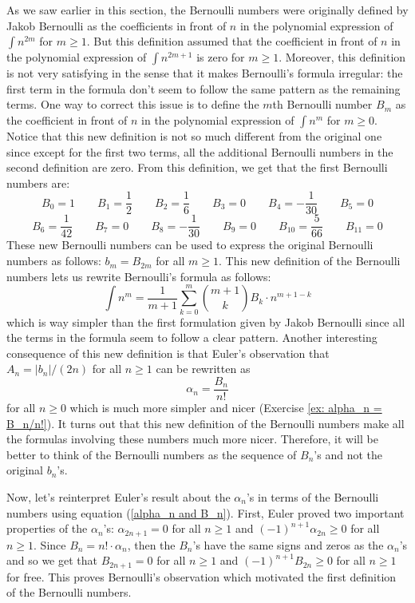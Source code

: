As we saw earlier in this section, the Bernoulli numbers were originally defined by Jakob Bernoulli as the coefficients in front of $n$ in the polynomial expression of $\int n^{2m}$ for $m \geq 1$. But this definition assumed that the coefficient in front of $n$ in the polynomial expression of $\int n^{2m+1}$ is zero for $m \geq 1$. Moreover, this definition is not very satisfying in the sense that it makes Bernoulli's formula irregular: the first term in the formula don't seem to follow the same pattern as the remaining terms. One way to correct this issue is to define the $m$th Bernoulli number $B_m$ as the coefficient in front of $n$ in the polynomial expression of $\int n^m$ for $m \geq 0$. Notice that this new definition is not so much different from the original one since except for the first two terms, all the additional Bernoulli numbers in the second definition are zero. From this definition, we get that the first Bernoulli numbers are:
$$B_0 = 1 \qquad B_1 = \frac{1}{2} \qquad B_2 = \frac{1}{6} \qquad B_3 = 0 \qquad B_4 = - \frac{1}{30} \qquad B_5 = 0 $$
$$B_6 = \frac{1}{42} \qquad B_7 = 0 \qquad B_8 = -\frac{1}{30} \qquad B_9 = 0 \qquad B_{10} = \frac{5}{66} \qquad B_{11} = 0$$
These new Bernoulli numbers can be used to express the original Bernoulli numbers as follows: $b_m = B_{2m}$ for all $m \geq 1$. This new definition of the Bernoulli numbers lets us rewrite Bernoulli's formula as follows:
\begin{equation} \label{Modern Bernoullis Formula}
    \int n^m = \frac{1}{m+1}\sum_{k=0}^{m}\binom{m+1}{k}B_k \cdot n^{m+1 - k}
\end{equation}
which is way simpler than the first formulation given by Jakob Bernoulli since all the terms in the formula seem to follow a clear pattern. Another interesting consequence of this new definition is that Euler's observation that $A_n = |b_n|/(2n)$ for all $n \geq 1$ can be rewritten as
\begin{equation} \label{alpha_n and B_n}
    \alpha_n = \frac{B_n}{n!}
\end{equation}
for all $n \geq 0$ which is much more simpler and nicer (Exercise \ref{ex: alpha_n = B_n/n!}). It turns out that this new definition of the Bernoulli numbers make all the formulas involving these numbers much more nicer. Therefore, it will be better to think of the Bernoulli numbers as the sequence of $B_n$'s and not the original $b_n$'s. 

Now, let's reinterpret Euler's result about the $\alpha_n$'s in terms of the Bernoulli numbers using equation (\ref{alpha_n and B_n}). First, Euler proved two important properties of the $\alpha_n$'s: $\alpha_{2n + 1} = 0$ for all $n \geq 1$ and $(-1)^{n+1}\alpha_{2n} \geq 0$ for all $n \geq 1$. Since $B_n = n! \cdot \alpha_n$, then the $B_n$'s have the same signs and zeros as the $\alpha_n$'s and so we get that $B_{2n + 1} = 0$ for all $n \geq 1$ and $(-1)^{n+1}B_{2n} \geq 0$ for all $n \geq 1$ for free. This proves Bernoulli's observation which motivated the first definition of the Bernoulli numbers.

